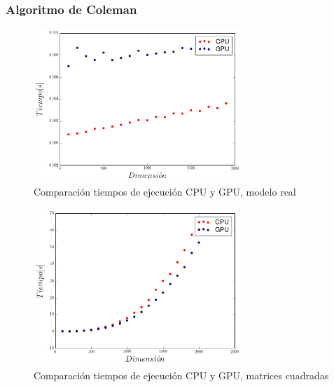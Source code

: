 \documentclass{beamer}
\begin{document}
            \begin{frame}
            \frametitle{Algoritmo de Coleman}
            \begin{figure}[h!t]
                \begin{center}
                    \includegraphics[width=0.7\textwidth]{img/speed_up_real}
                    \caption{Comparación tiempos de ejecución CPU y GPU, modelo real}
                    \label{fig:speedup_real}
                \end{center}
            \end{figure} 
            \end{frame}

            \begin{frame}
            \begin{figure}[h!t]
                \begin{center}
                    \includegraphics[width=0.7\textwidth]{img/speed_up_square}
                    \caption{Comparación tiempos de ejecución CPU y GPU, matrices cuadradas}
                    \label{fig:speedup_square}
                \end{center}
            \end{figure}
            \end{frame}
\end{document}
